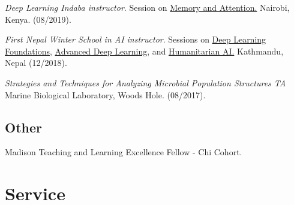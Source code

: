 \documentclass[letterpaper]{article}
\renewenvironment{itemize}{
  \begin{list}{}{
    \setlength{\leftmargin}{1.5em}
  }
}{
  \end{list}
}
\begin{document}
\begin{itemize}
\item \textit{Deep Learning Indaba instructor}. Session on \href{https://www.youtube.com/watch?v=9mWYFZwNpis}{Memory and Attention.} Nairobi, Kenya. (08/2019).
\item \textit{First Nepal Winter School in AI instructor}. Sessions on \href{https://www.youtube.com/watch?v=3lBMxO2zmGg}{Deep Learning Foundations}, \href{https://www.youtube.com/watch?v=OLaX-jmRUwY}{Advanced Deep Learning}, and \href{https://www.youtube.com/watch?v=RXZyGwa4TpY}{Humanitarian AI.} Kathmandu, Nepal (12/2018).
\item \textit{Strategies and Techniques for Analyzing Microbial Population Structures TA} Marine Biological Laboratory, Woods Hole. (08/2017).
\end{itemize}

\subsection*{Other}
\begin{itemize}
\item Madison Teaching and Learning Excellence Fellow - Chi Cohort.
\end{itemize}

\section*{Service}
\end{document}

